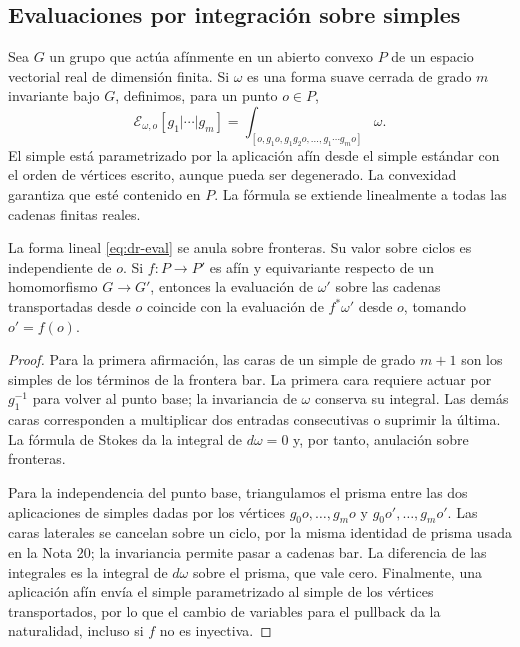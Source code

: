 \subsection{Evaluaciones por integración sobre simples}

Sea $G$ un grupo que actúa afínmente en un abierto convexo $P$ de un espacio vectorial real de dimensión finita. Si $\omega$ es una forma suave cerrada de grado $m$ invariante bajo $G$, definimos, para un punto $o\in P$,
\begin{equation}
 \mathcal E_{\omega,o}[g_1|\cdots|g_m]
 =\int_{[o,g_1o,g_1g_2o,\ldots,g_1\cdots g_mo]}\omega.
 \label{eq:dr-eval}
\end{equation}
El simple está parametrizado por la aplicación afín desde el simple estándar con el orden de vértices escrito, aunque pueda ser degenerado. La convexidad garantiza que esté contenido en $P$. La fórmula se extiende linealmente a todas las cadenas finitas reales.

\begin{proposicion}
\label{prop:dr-eval}
La forma lineal \eqref{eq:dr-eval} se anula sobre fronteras. Su valor sobre ciclos es independiente de $o$. Si $f:P\to P'$ es afín y equivariante respecto de un homomorfismo $G\to G'$, entonces la evaluación de $\omega'$ sobre las cadenas transportadas desde $o$ coincide con la evaluación de $f^*\omega'$ desde $o$, tomando $o'=f(o)$.
\end{proposicion}
\begin{proof}
Para la primera afirmación, las caras de un simple de grado $m+1$ son los simples de los términos de la frontera bar. La primera cara requiere actuar por $g_1^{-1}$ para volver al punto base; la invariancia de $\omega$ conserva su integral. Las demás caras corresponden a multiplicar dos entradas consecutivas o suprimir la última. La fórmula de Stokes da la integral de $d\omega=0$ y, por tanto, anulación sobre fronteras.

Para la independencia del punto base, triangulamos el prisma entre las dos aplicaciones de simples dadas por los vértices $g_0o,\ldots,g_mo$ y $g_0o',\ldots,g_mo'$. Las caras laterales se cancelan sobre un ciclo, por la misma identidad de prisma usada en la Nota 20; la invariancia permite pasar a cadenas bar. La diferencia de las integrales es la integral de $d\omega$ sobre el prisma, que vale cero. Finalmente, una aplicación afín envía el simple parametrizado al simple de los vértices transportados, por lo que el cambio de variables para el pullback da la naturalidad, incluso si $f$ no es inyectiva.
\end{proof}


